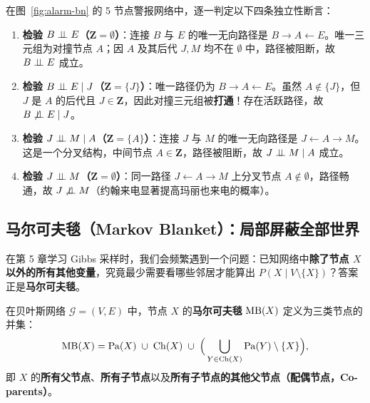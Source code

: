 \begin{example}\label{ex:alarm-dsep}
在图~\ref{fig:alarm-bn} 的 5 节点警报网络中，逐一判定以下四条独立性断言：
\begin{enumerate}
  \item \textbf{检验 $B \perp\!\!\!\perp E$（$\mathbf{Z} = \emptyset$）}：连接 $B$ 与 $E$ 的唯一无向路径是 $B \to A \leftarrow E$。唯一三元组为对撞节点 $A$；因 $A$ 及其后代 $J, M$ 均不在 $\emptyset$ 中，路径被阻断，故 $B \perp\!\!\!\perp E$ 成立。
  \item \textbf{检验 $B \perp\!\!\!\perp E \mid J$（$\mathbf{Z} = \{J\}$）}：唯一路径仍为 $B \to A \leftarrow E$。虽然 $A \notin \{J\}$，但 $J$ 是 $A$ 的后代且 $J \in \mathbf{Z}$，因此对撞三元组被\textbf{打通}！存在活跃路径，故 $B \not\perp\!\!\!\perp E \mid J$。
  \item \textbf{检验 $J \perp\!\!\!\perp M \mid A$（$\mathbf{Z} = \{A\}$）}：连接 $J$ 与 $M$ 的唯一无向路径是 $J \leftarrow A \to M$。这是一个分叉结构，中间节点 $A \in \mathbf{Z}$，路径被阻断，故 $J \perp\!\!\!\perp M \mid A$ 成立。
  \item \textbf{检验 $J \perp\!\!\!\perp M$（$\mathbf{Z} = \emptyset$）}：同一路径 $J \leftarrow A \to M$ 上分叉节点 $A \notin \emptyset$，路径畅通，故 $J \not\perp\!\!\!\perp M$（约翰来电显著提高玛丽也来电的概率）。
\end{enumerate}
\end{example}

\subsection{马尔可夫毯（Markov Blanket）：局部屏蔽全部世界}

在第 5 章学习 Gibbs 采样时，我们会频繁遇到一个问题：已知网络中\textbf{除了节点 $X$ 以外的所有其他变量}，究竟最少需要看哪些邻居才能算出 $P(X \mid V \setminus \{X\})$？答案正是\textbf{马尔可夫毯}。

\begin{defBox}
\begin{definition}\label{def:mb}
在贝叶斯网络 $\mathcal{G} = (V, E)$ 中，节点 $X$ 的\textbf{马尔可夫毯} $\operatorname{MB}(X)$ 定义为三类节点的并集：
\begin{equation}\label{eq:mb-def}
  \operatorname{MB}(X) = \operatorname{Pa}(X) \;\cup\; \operatorname{Ch}(X) \;\cup\; \Big(\bigcup_{Y \in \operatorname{Ch}(X)} \operatorname{Pa}(Y) \setminus \{X\}\Big),
\end{equation}
即 $X$ 的\textbf{所有父节点}、\textbf{所有子节点}以及\textbf{所有子节点的其他父节点（配偶节点，Co-parents）}。
\end{definition}
\end{defBox}

